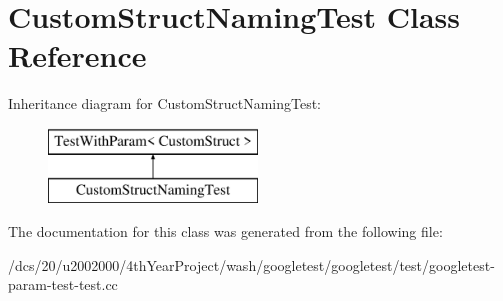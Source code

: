 \hypertarget{classCustomStructNamingTest}{}\section{Custom\+Struct\+Naming\+Test Class Reference}
\label{classCustomStructNamingTest}
Inheritance diagram for Custom\+Struct\+Naming\+Test\+:\begin{figure}[H]
\begin{center}
\leavevmode
\includegraphics[height=2.000000cm]{classCustomStructNamingTest}
\end{center}
\end{figure}


The documentation for this class was generated from the following file\+:\begin{DoxyCompactItemize}
\item 
/dcs/20/u2002000/4th\+Year\+Project/wash/googletest/googletest/test/googletest-\/param-\/test-\/test.\+cc\end{DoxyCompactItemize}
